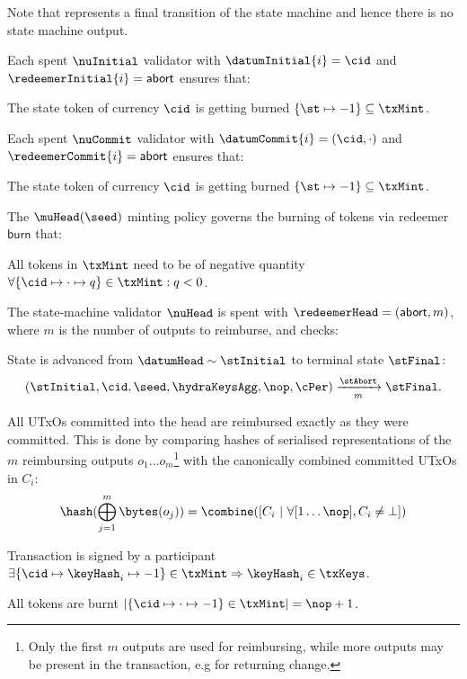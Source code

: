 Note that \mtxAbort{} represents a final transition of the state
machine and hence there is no state machine output.

\noindent Each spent $\nuInitial$ validator with $\datumInitial{i} = \cid$ and $\redeemerInitial{i} = \mathsf{abort}$ ensures that:
\begin{menumerate}
	\item The state token of currency $\cid$ is getting burned $\{\st \mapsto -1\} \subseteq \txMint$.
\end{menumerate}

\noindent Each spent $\nuCommit$ validator with $\datumCommit{i} = (\cid,\cdot)$ and $\redeemerCommit{i} = \mathsf{abort}$ ensures that:
\begin{menumerate}
	\item The state token of currency $\cid$ is getting burned $\{\st \mapsto -1\} \subseteq \txMint$.
\end{menumerate}

\noindent The $\muHead(\seed)$ minting policy governs the burning of tokens via
redeemer $\mathsf{burn}$ that:
\begin{menumerate}
	\item All tokens in $\txMint$ need to be of negative quantity
	$\forall \{\cid \mapsto \cdot \mapsto q\} \in \txMint : q < 0$.
\end{menumerate}

\noindent The state-machine validator $\nuHead$ is spent with
$\redeemerHead = (\mathsf{abort}, m)$, where $m$ is the number of outputs to
reimburse, and checks:
\begin{menumerate}
	\item State is advanced from $\datumHead \sim \stInitial$ to terminal state
	$\stFinal$: %
	\[
		(\stInitial,\cid,\seed,\hydraKeysAgg,\nop,\cPer) \xrightarrow[m]{\stAbort} \stFinal.
	\]
	\item All UTxOs committed into the head are reimbursed exactly as they were
	committed. This is done by comparing hashes of serialised representations of
	the $m$ reimbursing outputs $o_{1} \dots o_{m}$\footnote{Only the first $m$
		outputs are used for reimbursing, while more outputs may be present in the
		transaction, e.g for returning change.} with the canonically combined
	committed UTxOs in $C_{i}$:
	\[
		\hash(\bigoplus_{j=1}^{m} \bytes(o_{j})) = \combine([C_{i} ~ | ~ \forall [1\dots\nop], C_{i} \neq \bot])
	\]

	\item Transaction is signed by a participant $\exists \{\cid \mapsto \keyHash_{i} \mapsto -1\} \in \txMint \Rightarrow \keyHash_{i} \in \txKeys$.
	\item All tokens are burnt
	$|\{\cid \mapsto \cdot \mapsto -1\} \in \txMint| = \nop + 1$.
\end{menumerate}

